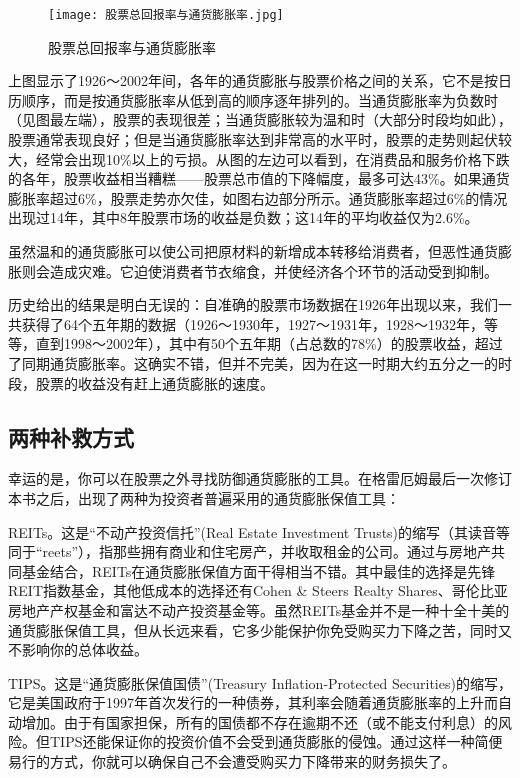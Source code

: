\documentclass[12pt,oneside]{book}
\begin{document}
\begin{figure}[H]
\centering
\texttt{[image: 股票总回报率与通货膨胀率.jpg]}
\caption{股票总回报率与通货膨胀率}
\end{figure}

上图显示了1926～2002年间，各年的通货膨胀与股票价格之间的关系，它不是按日历顺序，而是按通货膨胀率从低到高的顺序逐年排列的。当通货膨胀率为负数时（见图最左端），股票的表现很差；当通货膨胀较为温和时（大部分时段均如此），股票通常表现良好；但是当通货膨胀率达到非常高的水平时，股票的走势则起伏较大，经常会出现10\%以上的亏损。从图的左边可以看到，在消费品和服务价格下跌的各年，股票收益相当糟糕——股票总市值的下降幅度，最多可达43\%。如果通货膨胀率超过6\%，股票走势亦欠佳，如图右边部分所示。通货膨胀率超过6\%的情况出现过14年，其中8年股票市场的收益是负数；这14年的平均收益仅为2.6\%。

虽然温和的通货膨胀可以使公司把原材料的新增成本转移给消费者，但恶性通货膨胀则会造成灾难。它迫使消费者节衣缩食，并使经济各个环节的活动受到抑制。

历史给出的结果是明白无误的：自准确的股票市场数据在1926年出现以来，我们一共获得了64个五年期的数据（1926～1930年，1927～1931年，1928～1932年，等等，直到1998～2002年），其中有50个五年期（占总数的78\%）的股票收益，超过了同期通货膨胀率。这确实不错，但并不完美，因为在这一时期大约五分之一的时段，股票的收益没有赶上通货膨胀的速度。

\subsection{两种补救方式}
幸运的是，你可以在股票之外寻找防御通货膨胀的工具。在格雷厄姆最后一次修订本书之后，出现了两种为投资者普遍采用的通货膨胀保值工具：

REITs。这是“不动产投资信托”(Real Estate Investment Trusts)的缩写（其读音等同于“reets”），指那些拥有商业和住宅房产，并收取租金的公司。通过与房地产共同基金结合，REITs在通货膨胀保值方面干得相当不错。其中最佳的选择是先锋REIT指数基金，其他低成本的选择还有Cohen \& Steers Realty Shares、哥伦比亚房地产产权基金和富达不动产投资基金等。虽然REITs基金并不是一种十全十美的通货膨胀保值工具，但从长远来看，它多少能保护你免受购买力下降之苦，同时又不影响你的总体收益。

TIPS。这是“通货膨胀保值国债”(Treasury Inflation-Protected Securities)的缩写，它是美国政府于1997年首次发行的一种债券，其利率会随着通货膨胀率的上升而自动增加。由于有国家担保，所有的国债都不存在逾期不还（或不能支付利息）的风险。但TIPS还能保证你的投资价值不会受到通货膨胀的侵蚀。通过这样一种简便易行的方式，你就可以确保自己不会遭受购买力下降带来的财务损失了。
\end{document}
